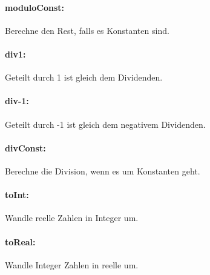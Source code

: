 \documentclass[a4paper]{article}
\begin{document}
\paragraph{moduloConst:} Berechne den Rest, falls es Konstanten sind.
\begin{mathpar}
\end{mathpar}
\paragraph{div1:} Geteilt durch 1 ist gleich dem Dividenden.
\begin{mathpar}
\end{mathpar}
\paragraph{div-1:} Geteilt durch -1 ist gleich dem negativem Dividenden.
\begin{mathpar}
\end{mathpar}
\paragraph{divConst:} Berechne die Division, wenn es um Konstanten geht.
\begin{mathpar}
\end{mathpar}
\paragraph{toInt:} Wandle reelle Zahlen in Integer um.
\begin{mathpar}
\end{mathpar}
\paragraph{toReal:} Wandle Integer Zahlen in reelle um.
\begin{mathpar}
\end{mathpar}
\end{document}
